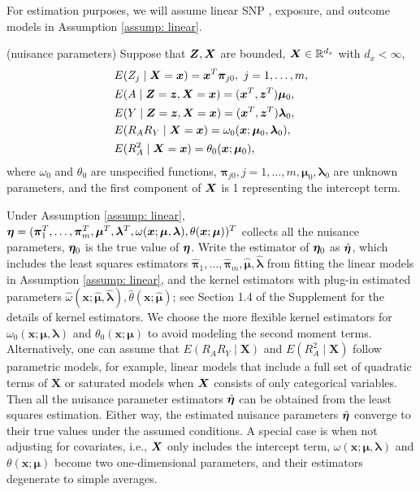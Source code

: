 \documentclass[12pt]{article}
\begin{document}
For estimation purposes, we will assume linear SNP 
\citep{Sun2021}, exposure, and outcome models in Assumption \ref{assump: linear}. 
\begin{assum} (nuisance parameters)\label{assump: linear}
	Suppose that $ \bm{Z}, \bm{X}  $ are bounded, $ \bm{X}\in \mathbb{R}^{d_x} $ with $ d_x<\infty $,  
	\begin{align*}
		&E(Z_j \mid \bm{X}= \bm x) = \bm x^T \bm \pi_{j0}, ~ j=1,\dots, m, \\
		&E(A\mid \bm{Z}= \bm{z}, \bm{X}= \bm x) =(\bm x^T, \bm{z}^T) \bm \mu_0, \\
		&E(Y\mid \bm{Z}= \bm{z}, \bm{X}= \bm x) =(\bm x^T, \bm{z}^T) \bm \lambda_0, \\
		& E(R_AR_Y \mid \bm{X}= \bm x)=\omega_0(\bm x; \bm\mu_0, \bm\lambda_0)   , \\
		& E(R_A^2\mid \bm{X}= \bm x)= \theta_0(\bm x; \bm \mu_0 ) , 
	\end{align*}
	where $ \omega_0 $ and $  \theta_0 $ are unspecified functions, {$\bm \pi_{j0}, j=1,\dots, m, \bm \mu_0, \bm \lambda_0$ are unknown parameters},
 and the first component of  $ \bm{X} $ is  1 representing the intercept term. 
\end{assum}
Under Assumption \ref{assump: linear},  $ \bm \eta= (\bm \pi_1^T,\dots, \bm \pi_m^T, \bm\mu^T,  \bm \lambda^T, \omega(\bm x; \bm\mu, \bm\lambda)  , \theta(\bm x; \bm \mu ) )^T$ collects all the nuisance parameters, $ \bm \eta_0 $ is the true value of $ \bm \eta $.  Write the estimator of $ \bm{\bm \eta}_0 $ as $ \hat{\bm{\bm \eta}} $, which includes the least squares estimators  $\hat{\bm \pi}_{1}, \dots, \hat{\bm \pi}_{m}, \hat{\bm \mu}, \hat{\bm \lambda}$ {from fitting the linear models in Assumption \ref{assump: linear},}  and the kernel estimators with plug-in estimated parameters  $ \hat \omega(\bm x; \hat{\bm\mu}, \hat{\bm\lambda}), \hat \theta(\bm x; \hat{\bm \mu})  $; {see Section 1.4 of the Supplement for the details of kernel estimators.} We choose the more flexible kernel estimators for  $ \omega_0(\bm x; \bm\mu, \bm\lambda) $ and $\theta_0(\bm x; \bm \mu )$ to avoid modeling the second moment terms. Alternatively, one can assume that   $E(R_A R_Y\mid \bm X)$ and $E(R_A^2 \mid  \bm X)$ follow parametric models, for example,	linear models that include a full set of quadratic terms of $\bm X$ or saturated models when $\bm{X}$ consists of only categorical variables. Then all the nuisance parameter estimators $\hat {\bm \eta}$ can be obtained from the least squares estimation. Either way,  {the estimated nuisance parameters $\hat {\bm \eta}$ converge to their true values under the assumed conditions}.  A special case is  when not adjusting for covariates, i.e., $ \bm{X} $ only includes the intercept term, $\omega(\bm x; \bm\mu, \bm\lambda)   $ and $ \theta(\bm x; \bm \mu ) $  become two one-dimensional parameters, and their estimators degenerate to simple averages. 
\end{document}
